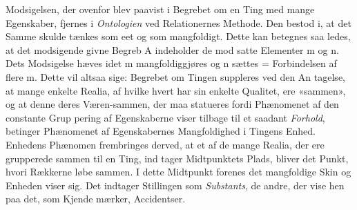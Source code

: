 \documentclass[12pt,a4paper]{book}
\begin{document}
Modsigelsen, der ovenfor blev paavist i Begrebet om en
Ting med mange Egenskaber, fjernes i \emph{Ontologien} ved
Relationernes Methode. Den bestod i, at det Samme skulde
tænkes som eet og som mangfoldigt. Dette kan betegnes saa\-%
ledes, at det modsigende givne Begreb A indeholder de mod\-%
satte Elementer m og n. Dets Modsigelse hæves idet m
mangfoldiggjøres og n sættes = Forbindelsen af flere m. Dette
vil altsaa sige: Begrebet om Tingen suppleres ved den An\-%
tagelse, at mange enkelte Realia, af hvilke hvert har sin enkelte
Qualitet, ere «sammen», og at denne deres Væren-sammen,
der maa statueres fordi Phænomenet af den constante Grup\-%
pering af Egenskaberne viser tilbage til et saadant \emph{Forhold},
betinger Phænomenet af Egenskabernes Mangfoldighed i Tingens
Enhed. Enhedens Phænomen frembringes derved, at et af de
mange Realia, der ere grupperede sammen til en Ting, ind\-%
tager Midtpunktets Plads, bliver det Punkt, hvori Rækkerne
løbe sammen. I dette Midtpunkt forenes det mangfoldige
Skin og Enheden viser sig. Det indtager Stillingen som
\emph{Substants}, de andre, der vise hen paa det, som Kjende\-%
mærker, Accidentser.
\end{document}
